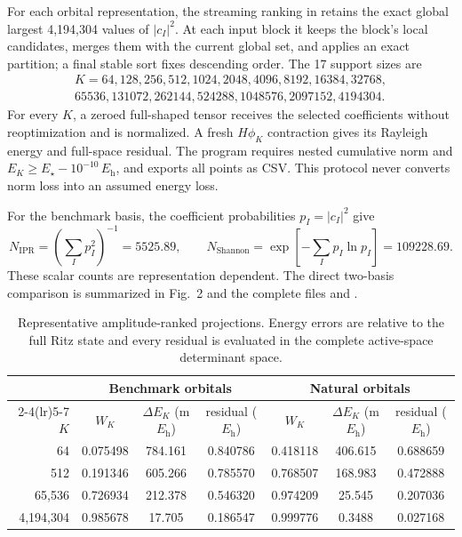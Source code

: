 \documentclass[aps,onecolumn,superscriptaddress,nofootinbib,longbibliography]{revtex4-2}
\newcommand{\Eh}{E_{\mathrm h}}
\begin{document}
For each orbital representation, the streaming ranking in
 retains the exact global
largest 4,194,304 values of \(|c_I|^2\).  At each input block it keeps the
block's local candidates, merges them with the current global set, and applies
an exact partition; a final stable sort fixes descending order.  The 17 support
sizes are
\begin{multline}
 K=64,128,256,512,1024,2048,4096,8192,16384,32768,\\
 65536,131072,262144,524288,1048576,2097152,4194304.
\end{multline}
For every \(K\), a zeroed full-shaped tensor receives the selected
coefficients without reoptimization and is normalized.  A fresh \(H\phi_K\)
contraction gives its Rayleigh energy and full-space residual.  The program
requires nested cumulative norm and
\(E_K\ge E_\star-10^{-10}\,\Eh\), and exports all points as CSV.  This protocol
never converts norm loss into an assumed energy loss.

For the benchmark basis, the coefficient probabilities
\(p_I=|c_I|^2\) give
\begin{equation}
 N_{\mathrm{IPR}}=(\sum_Ip_I^2)^{-1}=5525.89,\qquad
 N_{\mathrm{Shannon}}=\exp[-\sum_Ip_I\ln p_I]=109228.69.
\end{equation}
These scalar counts are representation dependent.  The direct two-basis
comparison is summarized in Fig.~2 and the complete files
 and
.  \LateBasisSentence

\begin{table}[h]
\caption{Representative amplitude-ranked projections.  Energy errors are
relative to the full Ritz state and every residual is evaluated in the complete
active-space determinant space.}
\label{tab:representative-topk}
\small
\begin{tabular}{rcccccc}
\toprule
& \multicolumn{3}{c}{Benchmark orbitals} & \multicolumn{3}{c}{Natural orbitals} \\
\cmidrule(lr){2-4}\cmidrule(lr){5-7}
\(K\) & \(W_K\) & \(\Delta E_K\) (m\(\Eh\)) & residual (\(\Eh\))
& \(W_K\) & \(\Delta E_K\) (m\(\Eh\)) & residual (\(\Eh\)) \\
\midrule
64 & 0.075498 & 784.161 & 0.840786 & 0.418118 & 406.615 & 0.688659 \\
512 & 0.191346 & 605.266 & 0.785570 & 0.768507 & 168.983 & 0.472888 \\
65,536 & 0.726934 & 212.378 & 0.546320 & 0.974209 & 25.545 & 0.207036 \\
4,194,304 & 0.985678 & 17.705 & 0.186547 & 0.999776 & 0.3488 & 0.027168 \\
\bottomrule
\end{tabular}
\end{table}
\end{document}
